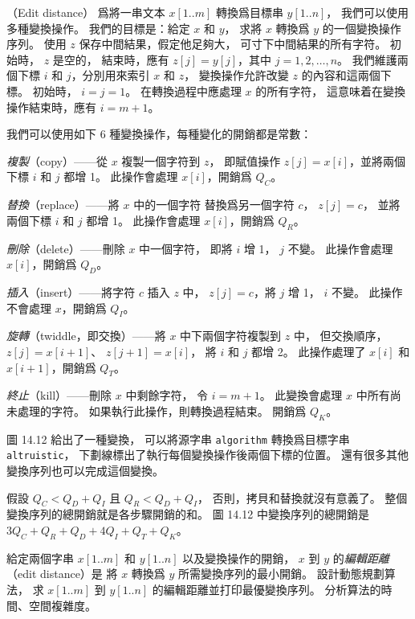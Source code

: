 \startPROBLEM
（Edit distance）
爲將一串文本 $x[1..m]$ 轉換爲目標串 $y[1..n]$，
我們可以使用多種變換操作。
我們的目標是：給定 $x$ 和 $y$，
求將 $x$ 轉換爲 $y$ 的一個變換操作序列。
使用 $z$ 保存中間結果，假定他足夠大，
可寸下中間結果的所有字符。
初始時， $z$ 是空的，
結束時，應有 $z[j]=y[j]$，其中 $j=1,2,\ldots,n$。
我們維護兩個下標 $i$ 和 $j$，分別用來索引 $x$ 和 $z$，
變換操作允許改變 $z$ 的內容和這兩個下標。
初始時， $i=j=1$。
在轉換過程中應處理 $x$ 的所有字符，
這意味着在變換操作結束時，應有 $i=m+1$。

我們可以使用如下 6 種變換操作，每種變化的開銷都是常數：
\startigBase
\item \emph{複製}（copy）——從 $x$ 複製一個字符到 $z$，
即賦值操作 $z[j] = x[i]$，並將兩個下標 $i$ 和 $j$ 都增 1。
此操作會處理 $x[i]$，開銷爲 $Q_C$。

\item \emph{替換}（replace）——將 $x$ 中的一個字符
替換爲另一個字符 $c$， $z[j]=c$，
並將兩個下標 $i$ 和 $j$ 都增 1。
此操作會處理 $x[i]$，開銷爲 $Q_R$。

\item \emph{刪除}（delete）——刪除 $x$ 中一個字符，
即將 $i$ 增 1， $j$ 不變。
此操作會處理 $x[i]$，開銷爲 $Q_D$。

\item \emph{插入}（insert）——將字符 $c$ 插入 $z$ 中，
 $z[j]=c$，將 $j$ 增 1， $i$ 不變。
此操作不會處理 $x$，開銷爲 $Q_I$。

\item \emph{旋轉}（twiddle，即交換）——將 $x$ 中下兩個字符複製到 $z$ 中，
但交換順序， $z[j]=x[i+1]$、 $z[j+1]=x[i]$，
將 $i$ 和 $j$ 都增 2。
此操作處理了 $x[i]$ 和 $x[i+1]$，開銷爲 $Q_T$。

\item \emph{終止}（kill）——刪除 $x$ 中剩餘字符，
令 $i=m+1$。
此變換會處理 $x$ 中所有尚未處理的字符。
如果執行此操作，則轉換過程結束。
開銷爲 $Q_K$。
\stopigBase

圖 14.12 給出了一種變換，
可以將源字串 {\tt algorithm} 轉換爲目標字串 {\tt altruistic}，
下劃線標出了執行每個變換操作後兩個下標的位置。
還有很多其他變換序列也可以完成這個變換。

假設 $Q_C<Q_D+Q_I$ 且 $Q_R<Q_D+Q_I$，
否則，拷貝和替換就沒有意義了。
整個變換序列的總開銷就是各步驟開銷的和。
圖 14.12 中變換序列的總開銷是 $3Q_C + Q_R + Q_D + 4Q_I + Q_T + Q_K$。


\startigBase[a]\startitem
給定兩個字串 $x[1..m]$ 和 $y[1..n]$ 以及變換操作的開銷，
 $x$ 到 $y$ 的\emph{編輯距離}（edit distance）是
將 $x$ 轉換爲 $y$ 所需變換序列的最小開銷。
設計動態規劃算法，
求 $x[1..m]$ 到 $y[1..n]$ 的編輯距離並打印最優變換序列。
分析算法的時間、空間複雜度。
\stopitem\stopigBase

